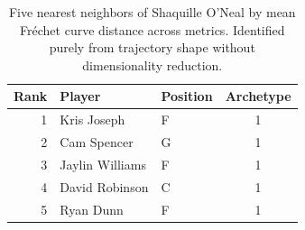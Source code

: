 \begin{table}[htbp]
  \centering\small
  \begin{tabular}{rllc}
    \toprule
    Rank & Player & Position & Archetype \\
    \midrule
    1 & Kris Joseph & F & 1 \\
    2 & Cam Spencer & G & 1 \\
    3 & Jaylin Williams & F & 1 \\
    4 & David Robinson & C & 1 \\
    5 & Ryan Dunn & F & 1 \\
    \bottomrule
  \end{tabular}
  \caption{Five nearest neighbors of Shaquille O'Neal by mean Fr\'{e}chet curve distance across metrics. Identified purely from trajectory shape without dimensionality reduction.}
  \label{tab:Shaquille_O_Neal_frechet_curve_neighbors}
\end{table}


